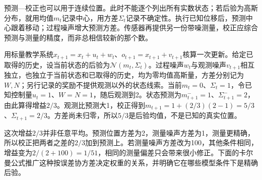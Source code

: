 预测—校正也可以用于连续位置。此时不能逐个列出所有实数状态；若后验为高斯分布，就用均值$m_t$记录中心，用方差$\Sigma_t$记录不确定性。执行已知位移后，预测中心跟着移动；过程噪声增大预测方差。传感器再提供另一份带噪测量，校正应综合预测与测量的精度，而非总相信较新的那个数。

\begin{example}[一次标量滤波]
  \label{ex:rl-information-kalman}
  用标量教学系统$x_{t+1}=x_t+u_t+w_t$、$o_{t+1}=x_{t+1}+v_{t+1}$核算一次更新。给定已取得的历史，设当前状态的后验为$\mathcal N(m_t,\Sigma_t)$。过程噪声$w_t$与观测噪声$v_{t+1}$相互独立，也独立于当前状态和已取得的历史，均为零均值高斯量，方差分别记为$W,N$；另行记录的奖励不提供观测以外的状态线索。当前$m_t=0$、$\Sigma_t=1$，令已知控制量$u_t=1$、$W=N=1$，随后观测到2。状态预测为$m^-_{t+1}=1$、$\Sigma^-_{t+1}=2$，由此算得增益$2/3$。观测比预测大1，校正得到$m_{t+1}=1+(2/3)(2-1)=5/3$、$\Sigma_{t+1}=2/3$。方差尚未归零，所以$5/3$是后验均值，不是已知的真实位置。
\end{example}

这次增益$2/3$并非任意平均。预测位置方差为2，测量噪声方差为1，测量更精确，所以校正把两者之差的$2/3$加到预测上。若测量噪声方差改为100，其他条件相同，增益变为$2/(2+100)=1/51$，相同的测量偏差只会带来很小修正。下面的卡尔曼公式推广这种按误差协方差决定权重的关系，并明确它在哪些模型条件下是精确后验。

